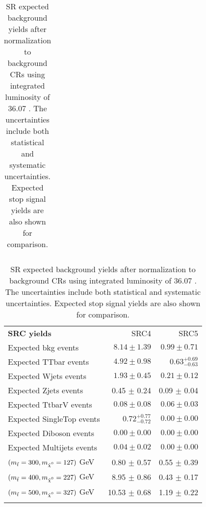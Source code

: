 \begin{table}
\begin{center}
{\begin{tabular*}{\textwidth}{@{\extracolsep{\fill}}lrrr}
\end{tabular*}
\begin{tabular*}{\textwidth}{@{\extracolsep{\fill}}lrr}
\noalign{\smallskip}\hline\noalign{\smallskip}
{\bf SRC yields}           & SRC4            & SRC5              \\[-0.05cm]
\noalign{\smallskip}\hline\noalign{\smallskip}
Expected bkg events         & $8.14 \pm 1.39$          & $0.99 \pm 0.71$              \\
\noalign{\smallskip}\hline\noalign{\smallskip}
        Expected TTbar events         & $4.92 \pm 0.98$          & $0.63_{-0.63}^{+0.69}$              \\
        Expected Wjets events         & $1.93 \pm 0.45$          & $0.21 \pm 0.12$              \\
        Expected Zjets events         & 0.45 $\pm$ 0.24          & 0.09 $\pm$ 0.04             \\
        Expected TtbarV events         & $0.08 \pm 0.08$          & $0.06 \pm 0.03$              \\
        Expected SingleTop events         & $0.72_{-0.72}^{+0.77}$          & $0.00 \pm 0.00$              \\
        Expected Diboson events         & $0.00 \pm 0.00$          & $0.00 \pm 0.00$              \\
        Expected Multijets events         & $0.04 \pm 0.02$          & $0.00 \pm 0.00$              \\
 \noalign{\smallskip}\hline\noalign{\smallskip}
$(\mstop = 300, \mLSP = 127)$ GeV & 0.80 $\pm$ 0.57 &  0.55 $\pm$ 0.39 \\
$(\mstop = 400, \mLSP = 227)$ GeV & 8.95 $\pm$ 0.86 & 0.43 $\pm$ 0.17 \\
$(\mstop = 500, \mLSP = 327)$ GeV & 10.53 $\pm$ 0.68  & 1.19 $\pm$ 0.22 \\
 \noalign{\smallskip}\hline\noalign{\smallskip}
\end{tabular*}

}
\end{center}
\caption{SR expected background yields after normalization to background CRs using integrated luminosity of 36.07 \ifb. The uncertainties include both statistical and systematic uncertainties.  Expected stop signal yields are also shown for comparison.}
\label{table.SRYields}
\end{table}
%

